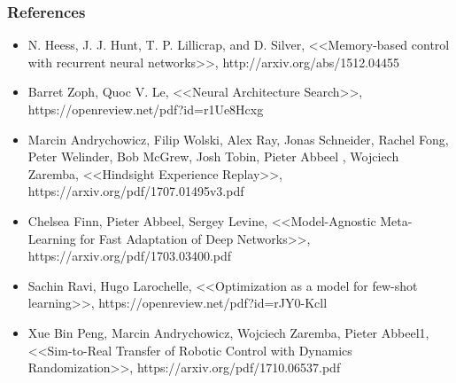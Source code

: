 \documentclass[fleqn, xcolor=x11names]{beamer}
\begin{document}
\begin{frame}\frametitle{References}
{\footnotesize  
\begin{itemize}
\item N. Heess, J. J. Hunt, T. P. Lillicrap, and D. Silver, <<Memory-based
control with recurrent neural networks>>, http://arxiv.org/abs/1512.04455
\item Barret Zoph, Quoc V. Le, <<Neural Architecture Search>>, https://openreview.net/pdf?id=r1Ue8Hcxg
\item Marcin Andrychowicz, Filip Wolski, Alex Ray, Jonas Schneider, Rachel Fong,
Peter Welinder, Bob McGrew, Josh Tobin, Pieter Abbeel
, Wojciech Zaremba, <<Hindsight Experience Replay>>, https://arxiv.org/pdf/1707.01495v3.pdf
\item Chelsea Finn, Pieter Abbeel, Sergey Levine, <<Model-Agnostic Meta-Learning for Fast Adaptation of Deep Networks>>, https://arxiv.org/pdf/1703.03400.pdf
\item Sachin Ravi, Hugo Larochelle, <<Optimization as a model for few-shot learning>>, https://openreview.net/pdf?id=rJY0-Kcll
\item Xue Bin Peng, Marcin Andrychowicz, Wojciech Zaremba, Pieter Abbeel1, <<Sim-to-Real Transfer of Robotic Control with Dynamics Randomization>>, https://arxiv.org/pdf/1710.06537.pdf
\end{itemize}

}

\end{frame}
\end{document}
